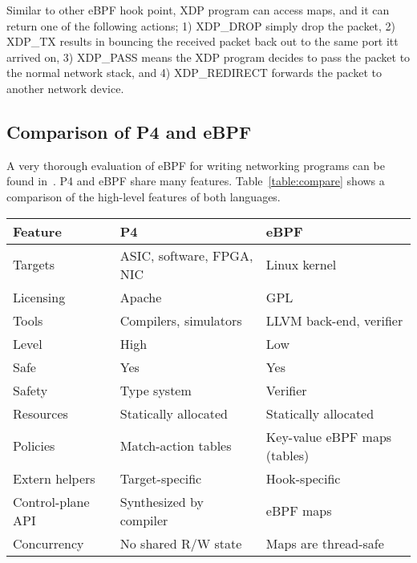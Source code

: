 Similar to other eBPF hook point, XDP program can access maps, and 
it can return one of the following actions;
1) XDP\_DROP simply drop the packet, 2) XDP\_TX results in bouncing
the received packet back out to the same port itt arrived on,
3) XDP\_PASS means the XDP program decides to pass the packet to
the normal network stack, and 4) XDP\_REDIRECT forwards the packet
to another network device.

\subsection{Comparison of P4 and eBPF}

A very thorough evaluation of eBPF for writing networking programs can
be found in~\cite{minao-hspr18}.  P4 and eBPF share many features.
Table~\ref{table:compare} shows a comparison of the high-level
features of both languages.

\begin{table*}[h]
  \footnotesize
  \begin{center}
  \begin{tabular}{|l|l|l|} \hline
    \textbf{Feature} & \textbf{P4} & \textbf{eBPF} \\ \hline \hline
    Targets & ASIC, software, FPGA, NIC & Linux kernel \\ \hline
    Licensing & Apache & GPL \\ \hline
    Tools & Compilers, simulators & LLVM back-end, verifier \\ \hline
    Level & High & Low \\ \hline
    Safe  & Yes & Yes \\ \hline
    Safety & Type system & Verifier \\ \hline
    Resources & Statically allocated & Statically allocated \\ \hline
    Policies & Match-action tables & Key-value eBPF maps (tables) \\ \hline
    Extern helpers & Target-specific & Hook-specific \\ \hline
    Control-plane API & Synthesized by compiler & eBPF maps \\ \hline
    Concurrency & No shared R/W state & Maps are thread-safe \\ \hline
  \end{tabular}
  \caption{Feature comparison between P4 and eBPF.}\label{table:compare}
  \end{center}
\end{table*}

